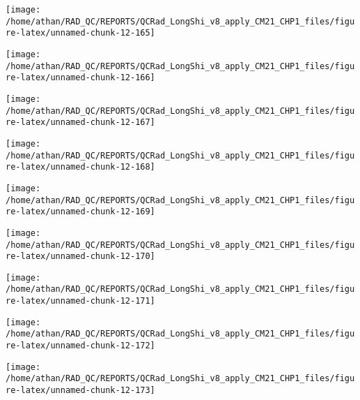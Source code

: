 \documentclass[
  10pt,
  a4paper,oneside]{article}
\begin{document}
\begin{center}\texttt{[image: /home/athan/RAD\_QC/REPORTS/QCRad\_LongShi\_v8\_apply\_CM21\_CHP1\_files/figure-latex/unnamed-chunk-12-165]} \end{center}

\begin{center}\texttt{[image: /home/athan/RAD\_QC/REPORTS/QCRad\_LongShi\_v8\_apply\_CM21\_CHP1\_files/figure-latex/unnamed-chunk-12-166]} \end{center}

\begin{center}\texttt{[image: /home/athan/RAD\_QC/REPORTS/QCRad\_LongShi\_v8\_apply\_CM21\_CHP1\_files/figure-latex/unnamed-chunk-12-167]} \end{center}

\begin{center}\texttt{[image: /home/athan/RAD\_QC/REPORTS/QCRad\_LongShi\_v8\_apply\_CM21\_CHP1\_files/figure-latex/unnamed-chunk-12-168]} \end{center}

\begin{center}\texttt{[image: /home/athan/RAD\_QC/REPORTS/QCRad\_LongShi\_v8\_apply\_CM21\_CHP1\_files/figure-latex/unnamed-chunk-12-169]} \end{center}

\begin{center}\texttt{[image: /home/athan/RAD\_QC/REPORTS/QCRad\_LongShi\_v8\_apply\_CM21\_CHP1\_files/figure-latex/unnamed-chunk-12-170]} \end{center}

\begin{center}\texttt{[image: /home/athan/RAD\_QC/REPORTS/QCRad\_LongShi\_v8\_apply\_CM21\_CHP1\_files/figure-latex/unnamed-chunk-12-171]} \end{center}

\begin{center}\texttt{[image: /home/athan/RAD\_QC/REPORTS/QCRad\_LongShi\_v8\_apply\_CM21\_CHP1\_files/figure-latex/unnamed-chunk-12-172]} \end{center}

\begin{center}\texttt{[image: /home/athan/RAD\_QC/REPORTS/QCRad\_LongShi\_v8\_apply\_CM21\_CHP1\_files/figure-latex/unnamed-chunk-12-173]} \end{center}
\end{document}
